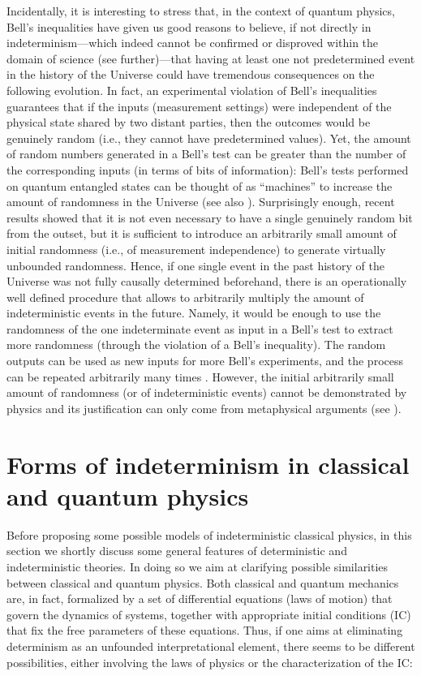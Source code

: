 \documentclass[12pt]{article}
\begin{document}
Incidentally, it is interesting to stress that, in the context of quantum physics, Bell's inequalities \cite{bell} have given us good reasons to believe, if not directly in indeterminism---which indeed cannot be confirmed or disproved within the domain of science (see further)---that having at least one not predetermined event in the history of the Universe could have tremendous consequences on the following evolution. In fact, an experimental violation of Bell’s inequalities guarantees that if the inputs (measurement settings) were independent of the physical state shared by two distant parties, then the outcomes would be genuinely random (i.e., they cannot have predetermined values). Yet, the amount of random numbers generated in a Bell's test can be greater than the number of the corresponding inputs (in terms of bits of information): Bell's tests performed on quantum entangled states can be thought of as “machines” to increase the amount of randomness in the Universe (see also \cite{gisin2010}). Surprisingly enough, recent results \cite{renner, putz} showed that it is not even necessary to have a single genuinely random bit from the outset, but it is sufficient to introduce an arbitrarily small amount of initial randomness (i.e., of measurement independence) to generate virtually unbounded randomness. Hence, if one single event in the past history of the Universe was not fully causally determined beforehand, there is an operationally well defined procedure that allows to arbitrarily multiply the amount of indeterministic events in the future. Namely, it would be enough to use the randomness of the one indeterminate event as input in a Bell's test to extract more randomness (through the violation of a Bell's inequality). The random outputs can be used as new inputs for more Bell's experiments, and the process can be repeated arbitrarily many times \cite{amplification}. However, the initial arbitrarily small amount of randomness (or of indeterministic events) cannot be demonstrated by physics and its justification can only come from metaphysical arguments (see \cite{suppes}).



\section{Forms of indeterminism in classical and quantum physics}
Before proposing some possible models of indeterministic classical physics, in this section we shortly discuss some general features of deterministic and indeterministic theories. In doing so we aim at clarifying possible similarities between classical and quantum physics. Both classical and quantum mechanics are, in fact, formalized by a set of differential equations (laws of motion) that govern the dynamics of systems, together with appropriate initial conditions (IC) that fix the free parameters of these equations. Thus, if one aims at eliminating determinism as an unfounded interpretational element, there seems to be different possibilities, either involving the laws of physics or the characterization of the IC:
\end{document}
